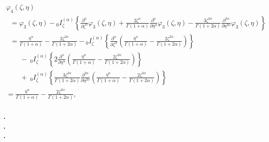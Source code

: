 \documentclass[10pt]{NSP1}
\begin{document}
\begin{equation}
\label{eq35}
\begin{array}{lllll}
 \varphi _4 \left( {\zeta ,\eta } \right) \\
\;\; =\varphi _3 \left( {\zeta ,\eta } \right)-{ }_0I_\zeta ^{\left( \alpha
\right)}\left\{ {\frac{\partial ^\alpha }{\partial \zeta ^\alpha }\varphi _3
\left( {\zeta ,\eta } \right)+\frac{2\zeta ^\alpha }{\Gamma \left( {1+\alpha
} \right)}\frac{\partial ^\alpha }{\partial \eta ^\alpha }\varphi _3 \left(
{\zeta ,\eta } \right)-\frac{3\zeta ^{2\alpha }}{\Gamma \left( {1+2\alpha }
\right)}\frac{\partial ^{2\alpha }}{\partial \eta ^{2\alpha }}\varphi _3
\left( {\zeta ,\eta } \right)} \right\} \\
\;\; =\frac{\eta ^\alpha }{\Gamma \left( {1+\alpha } \right)}-\frac{2\zeta
^{2\alpha }}{\Gamma \left( {1+2\alpha } \right)}-{ }_0I_\zeta ^{\left(
\alpha \right)}\left\{ {\frac{\partial ^\alpha }{\partial \zeta ^\alpha
}\left( {\frac{\eta ^\alpha }{\Gamma \left( {1+\alpha }
\right)}-\frac{2\zeta ^{2\alpha }}{\Gamma \left( {1+2\alpha } \right)}}
\right)} \right\} \\
\qquad -\;_0I_\zeta ^{\left( \alpha \right)}\left\{ {2\frac{\partial ^\alpha
}{\partial \eta ^\alpha }\left( {\frac{\eta ^\alpha }{\Gamma \left(
{1+\alpha } \right)}-\frac{2\zeta ^{2\alpha }}{\Gamma \left( {1+2\alpha }
\right)}} \right)} \right\} \\
\qquad +\;_0I_\zeta ^{\left( \alpha \right)}\left\{ {\frac{3\zeta ^{2\alpha
}}{\Gamma \left( {1+2\alpha } \right)}\frac{\partial ^{2\alpha }}{\partial
\eta ^{2\alpha }}\left( {\frac{\eta ^\alpha }{\Gamma \left( {1+\alpha }
\right)}-\frac{2\zeta ^{2\alpha }}{\Gamma \left( {1+2\alpha } \right)}}
\right)} \right\} \\
 =\frac{\eta ^\alpha }{\Gamma \left( {1+\alpha } \right)}-\frac{2\zeta
^{2\alpha }}{\Gamma \left( {1+2\alpha } \right)} ,\\
\end{array}
\end{equation}

\begin{center}
{\bf\large .}\\
{\bf\large .}\\
{\bf\large .}\\
\end{center}
\end{document}
